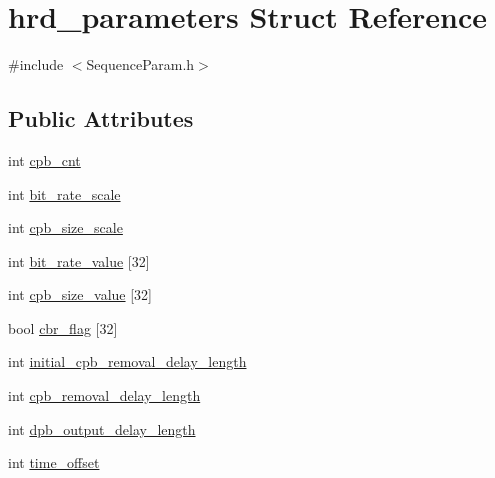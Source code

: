 \hypertarget{structhrd__parameters}{
\section{hrd\_\-parameters Struct Reference}
\label{structhrd__parameters}
}


{\ttfamily \#include $<$SequenceParam.h$>$}

\subsection*{Public Attributes}
\begin{DoxyCompactItemize}
\item 
int \hyperlink{structhrd__parameters_a5c6bed7c8fb56f19fcc45d6b48da49af}{cpb\_\-cnt}
\item 
int \hyperlink{structhrd__parameters_ace569254868da81da601fe785961eeab}{bit\_\-rate\_\-scale}
\item 
int \hyperlink{structhrd__parameters_a1609158ce4cbe36e43435936d38b8f59}{cpb\_\-size\_\-scale}
\item 
int \hyperlink{structhrd__parameters_a201add02afdd5156e2559a0420c7ef0f}{bit\_\-rate\_\-value} \mbox{[}32\mbox{]}
\item 
int \hyperlink{structhrd__parameters_a7a2bb5e5dc6c92094669161b33fa5e61}{cpb\_\-size\_\-value} \mbox{[}32\mbox{]}
\item 
bool \hyperlink{structhrd__parameters_aa759c54246d4b4a1ceecc44d56c352c5}{cbr\_\-flag} \mbox{[}32\mbox{]}
\item 
int \hyperlink{structhrd__parameters_a813b2fc9ba06ba6c074610f2469ec2cf}{initial\_\-cpb\_\-removal\_\-delay\_\-length}
\item 
int \hyperlink{structhrd__parameters_a190beef0ba6621955e55235eaa3adf87}{cpb\_\-removal\_\-delay\_\-length}
\item 
int \hyperlink{structhrd__parameters_a5c0bcd60b7cc600016714f0634b8e86c}{dpb\_\-output\_\-delay\_\-length}
\item 
int \hyperlink{structhrd__parameters_a433e874835df091a3754948b51714567}{time\_\-offset}
\end{DoxyCompactItemize}


